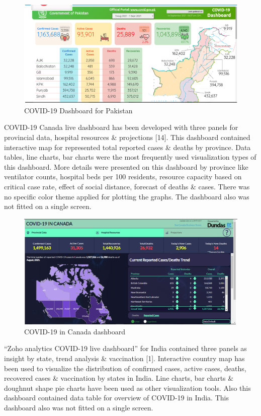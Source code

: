 \documentclass[
]{article}
\begin{document}
\begin{figure}
\includegraphics[width=8.33in]{Images/7} \caption{COVID-19 Dashboard for Pakistan}\label{fig:unnamed-chunk-7}
\end{figure}

COVID-19 Canada live dashboard has been developed with three panels for
provincial data, hospital resources \& projections {[}14{]}. This
dashboard contained interactive map for represented total reported cases
\& deaths by province. Data tables, line charts, bar charts were the
most frequently used visualization types of this dashboard. More details
were presented on this dashboard by province like ventilator counts,
hospital beds per 100 residents, resource capacity based on critical
case rate, effect of social distance, forecast of deaths \& cases. There
was no specific color theme applied for plotting the graphs. The
dashboard also was not fitted on a single screen.

\begin{figure}
\includegraphics[width=8.47in]{Images/8} \caption{COVID-19 in Canada dashboard}\label{fig:unnamed-chunk-8}
\end{figure}

``Zoho analytics COVID-19 live dashboard'' for India contained three
panels as insight by state, trend analysis \& vaccination {[}1{]}.
Interactive country map has been used to visualize the distribution of
confirmed cases, active cases, deaths, recovered cases \& vaccination by
states in India. Line charts, bar charts \& doughnut shape pie charts
have been used as other visualization tools. Also this dashboard
contained data table for overview of COVID-19 in India. This dashboard
also was not fitted on a single screen.
\end{document}
